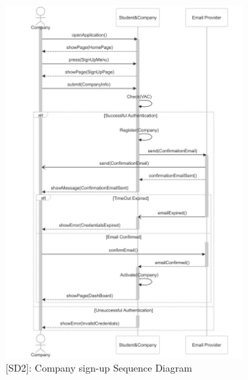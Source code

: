\begin{figure}
    \centering
    \includegraphics[width=0.8\textwidth]{Latex/Images/CompanySignUpSequenceDiagram.png}
    \caption{[SD2]: Company sign-up Sequence Diagram}
    \label{fig:SD2}
\end{figure}
\clearpage

